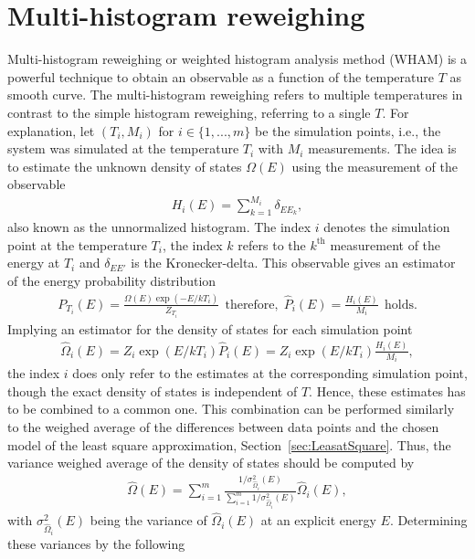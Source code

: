 
\section{Multi-histogram reweighing}
\label{sec:wham}

Multi-histogram reweighing or weighted histogram analysis method (WHAM) is a powerful technique to obtain an observable as a function of
the temperature $T$ as smooth curve. The multi-histogram reweighing refers to multiple temperatures in contrast to the simple histogram 
reweighing, referring to a single $T$. For explanation, let $(T_i,M_i)$ for $i\!\in\!\{1,...,m\}$ be the simulation points, i.e., the system 
was simulated at the temperature $T_i$ with $M_i$ measurements. The idea is to estimate the unknown density of states $\Omega(E)$ using 
the measurement of the observable
\begin{align*}
    H_i(E)=\sum_{k=1}^{M_i}\delta_{EE_k},
\end{align*}
also known as the unnormalized histogram. The index $i$ denotes the simulation point at the temperature $T_i$, the index $k$
refers to the $k^\text{th}$ measurement of the energy at $T_i$ and $\delta_{EE'}$ is the Kronecker-delta. This observable gives an estimator of 
the energy probability distribution
\begin{align*}
    P_{T_i}(E)=\frac{\Omega(E)\exp(-E/kT_i)}{Z_{T_i}} \  \  \text{therefore,} \  \  \hat{P}_i(E)=\frac{H_i(E)}{M_i} \  \  \text{holds.}
\end{align*}
Implying an estimator for the density of states for each simulation point 
\begin{align*}
    \hat{\Omega}_i(E)=Z_i\exp(E/kT_i)\hat{P}_i(E)=Z_i\exp(E/kT_i)\frac{H_i(E)}{M_i} ,
\end{align*}
the index $i$ does only refer to the estimates at the corresponding simulation point, though the exact density of states is independent of $T$.
Hence, these estimates has to be combined to a common one. This combination can be performed similarly to the weighed average
of the differences between data points and the chosen model of the least square approximation, Section~\ref{sec:LeasatSquare}. Thus, the variance 
weighed average of the density of states should be computed by
\begin{align*}
    \hat{\Omega}(E)=\sum_{i=1}^m\frac{1/\sigma^2_{\hat{\Omega}_i}(E)}{\sum_{i=1}^m1/\sigma^2_{\hat{\Omega}_i}(E)}\hat{\Omega}_i(E),
\end{align*}
with $\sigma^2_{\hat{\Omega}_i}(E)$ being the variance of $\hat{\Omega}_i(E)$ at an explicit energy $E$. Determining these variances by the following 
